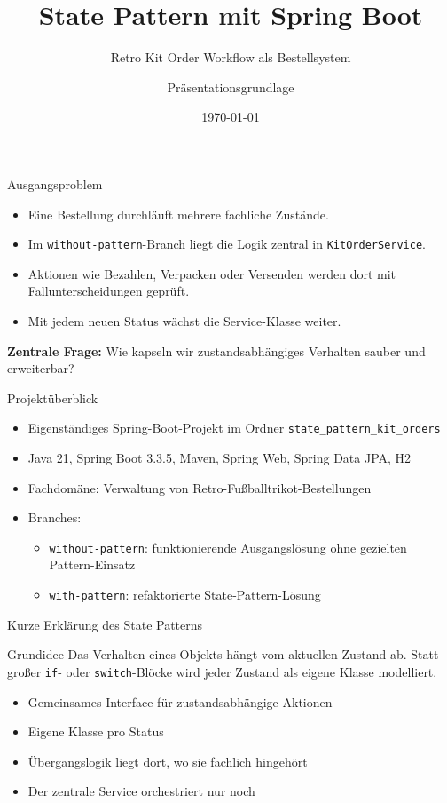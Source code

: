 \documentclass[aspectratio=169]{beamer}
\title{State Pattern mit Spring Boot}
\subtitle{Retro Kit Order Workflow als Bestellsystem}
\author{Präsentationsgrundlage}
\institute{IT-Kolleg Projektarbeit}
\date{\today}
\begin{document}
\begin{frame}
  \titlepage
\end{frame}

\begin{frame}{Ausgangsproblem}
  \begin{itemize}
    \item Eine Bestellung durchläuft mehrere fachliche Zustände.
    \item Im \texttt{without-pattern}-Branch liegt die Logik zentral in \texttt{KitOrderService}.
    \item Aktionen wie Bezahlen, Verpacken oder Versenden werden dort mit Fallunterscheidungen geprüft.
    \item Mit jedem neuen Status wächst die Service-Klasse weiter.
  \end{itemize}
  \vspace{0.4cm}
  \textbf{Zentrale Frage:} Wie kapseln wir zustandsabhängiges Verhalten sauber und erweiterbar?
\end{frame}

\begin{frame}{Projektüberblick}
  \small
  \begin{itemize}
    \item Eigenständiges Spring-Boot-Projekt im Ordner \texttt{state\_pattern\_kit\_orders}
    \item Java 21, Spring Boot 3.3.5, Maven, Spring Web, Spring Data JPA, H2
    \item Fachdomäne: Verwaltung von Retro-Fußballtrikot-Bestellungen
    \item Branches:
    \begin{itemize}
      \item \texttt{without-pattern}: funktionierende Ausgangslösung ohne gezielten Pattern-Einsatz
      \item \texttt{with-pattern}: refaktorierte State-Pattern-Lösung
    \end{itemize}
  \end{itemize}
\end{frame}

\begin{frame}{Kurze Erklärung des State Patterns}
  \begin{block}{Grundidee}
    Das Verhalten eines Objekts hängt vom aktuellen Zustand ab. Statt großer \texttt{if}- oder \texttt{switch}-Blöcke wird jeder Zustand als eigene Klasse modelliert.
  \end{block}
  \begin{itemize}
    \item Gemeinsames Interface für zustandsabhängige Aktionen
    \item Eigene Klasse pro Status
    \item Übergangslogik liegt dort, wo sie fachlich hingehört
    \item Der zentrale Service orchestriert nur noch
  \end{itemize}
\end{frame}
\end{document}

